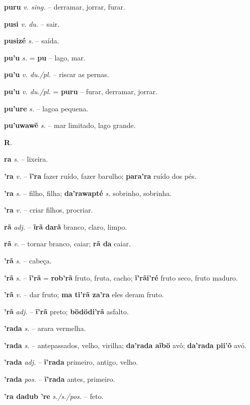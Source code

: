 \textbf{puru} \textit{v. sing.} -- derramar, jorrar, furar.

\textbf{pusi} \textit{v. du.} -- sair.

\textbf{pusizé} \textit{s.} -- saída.

\textbf{pu'u} \textit{s.} = \textbf{pu} -- lago, mar.

\textbf{pu'u} \textit{v. du./pl.} -- riscar as pernas.

\textbf{pu'u} \textit{v. du./pl.} = \textbf{puru} -- furar, derramar, jorrar.

\textbf{pu'ure} \textit{s.} -- lagoa pequena.

\textbf{pu'uwawẽ} \textit{s.} -- mar limitado, lago grande.



\textbf{R}.



\textbf{ra} \textit{s.} -- lixeira.

\textbf{'ra} \textit{v.} -- \textbf{ĩ'ra} fazer ruído, fazer barulho; \textbf{para'ra} ruído dos pés.

\textbf{'ra} \textit{s.} -- filho, filha; \textbf{da'rawapté} \textit{s.} sobrinho, sobrinha.

\textbf{'ra} \textit{v.} -- criar filhos, procriar.

\textbf{rã} \textit{adj.} -- \textbf{ĩrã} \textbf{darã} branco, claro, limpo.

\textbf{rã} \textit{v.} -- tornar branco, caiar; \textbf{rã da} caiar.

\textbf{'rã} \textit{s.} -- cabeça.

\textbf{'rã} \textit{s.} -- \textbf{ĩ'rã} = \textbf{rob'rã} fruto, fruta, cacho; \textbf{ĩ'rãi'ré} fruto seco, fruto maduro.

\textbf{'rã} \textit{v.} -- dar fruto; \textbf{ma ti'rã za'ra} eles deram fruto.

\textbf{'rã} \textit{adj.} -- \textbf{ĩ'rã} preto; \textbf{bödödi'rã} asfalto.

\textbf{'rada} \textit{s.} -- arara vermelha.

\textbf{'rada} \textit{s.} -- antepassados, velho, virilha; \textbf{da'rada aĩbö} avô; \textbf{da'rada pii'õ} avó.

\textbf{'rada} \textit{adj.} -- \textbf{ĩ'rada} primeiro, antigo, velho.

\textbf{'rada} \textit{pos.} -- \textbf{ĩ'rada} antes, primeiro.

\textbf{'ra dadub 're} \textit{s./s./pos.} -- feto.

